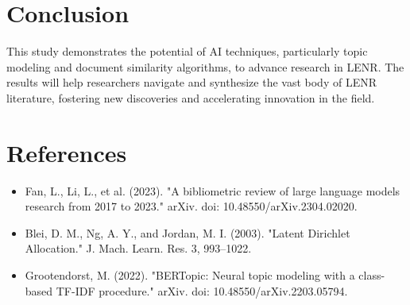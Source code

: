 \documentclass[12pt]{article}
\begin{document}
\section{Conclusion}
    This study demonstrates the potential of AI techniques, particularly topic modeling and document similarity algorithms, to advance research in LENR. The results will help researchers navigate and synthesize the vast body of LENR literature, fostering new discoveries and accelerating innovation in the field.

\section{References}
\begin{itemize}
    \item Fan, L., Li, L., et al. (2023). "A bibliometric review of large language models research from 2017 to 2023." arXiv. doi: 10.48550/arXiv.2304.02020.
    \item Blei, D. M., Ng, A. Y., and Jordan, M. I. (2003). "Latent Dirichlet Allocation." J. Mach. Learn. Res. 3, 993–1022.
    \item Grootendorst, M. (2022). "BERTopic: Neural topic modeling with a class-based TF-IDF procedure." arXiv. doi: 10.48550/arXiv.2203.05794.
\end{itemize}
\end{document}
